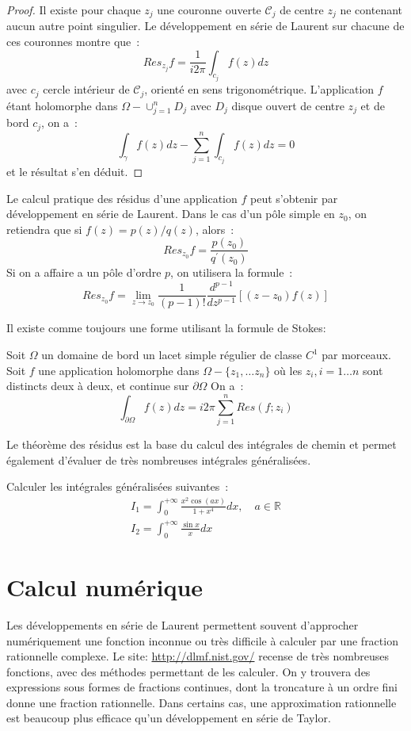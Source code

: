 \begin{proof}
Il existe pour chaque $z_j$ une
couronne ouverte $\mathcal{C}_j$ de centre $z_j$ ne contenant aucun autre point
singulier. Le développement en série de Laurent sur chacune de ces couronnes
montre que~:
\[
Res_{z_j}f = \frac{1}{i 2 \pi} \int_{c_j} f(z) dz
\]
avec $c_j$ cercle intérieur de $\mathcal{C}_j$, orienté en sens
trigonométrique. L'application $f$ étant holomorphe dans $\Omega - \cup_{j=1}^n
D_j$ avec $D_j$ disque ouvert de centre $z_j$ et de bord $c_j$, on a~:
\[
\int_{\gamma} f(z) dz - \sum_{j=1}^n \int_{c_j} f(z)dz =0
\]
et le résultat s'en déduit.
\end{proof}
\begin{rem}
Le calcul pratique des résidus d'une application $f$ peut s'obtenir par
développement en série de Laurent. Dans le cas d'un pôle simple en $z_0$, on
retiendra que si $f(z)=p(z)/q(z)$, alors~:
\[
Res_{z_0}f = \frac{p(z_0)}{q^\prime(z_0)}
\]
Si on a affaire a un pôle d'ordre $p$, on utilisera la formule~:
\[
Res_{z_0}f = \lim_{z \to z_0} \frac{1}{(p-1)!}
\frac{d^{p-1}}{dz^{p-1}}[(z-z_0)f(z)]
\]
\end{rem}
Il existe comme toujours une forme utilisant la formule de Stokes:

\begin{fthm}
Soit $\Omega$ un domaine de bord un lacet simple régulier de classe $C^1$
par morceaux. Soit $f$ une application
holomorphe dans $\Omega-\{z_1, \dots z_n\}$ où les $z_i,i=1\dots n$ sont
distincts deux à deux, et continue sur $\partial \Omega$ On a~:
\[
\int_{\partial \Omega} f(z) dz = i 2 \pi \sum_{j=1}^n Res(f;z_i)
\]
\end{fthm}

Le théorème des résidus est la base du calcul des intégrales de chemin et permet
également d'évaluer de très nombreuses intégrales généralisées.
\begin{exercice}
Calculer les intégrales généralisées suivantes~:
\[
\begin{array}{l}
I_1 = \int_0^{+\infty} \frac{x^2 \cos(ax)}{1+x^4} dx , \quad a \in
\mathbb{R}\\
I_2 = \int_0^{+\infty} \frac{ \sin x}{x}dx
\end{array}
\]
\end{exercice}
\section{Calcul numérique}
Les développements en série de Laurent permettent souvent d'approcher numériquement une fonction inconnue ou très difficile à calculer par une fraction rationnelle complexe. Le site:
\url{http://dlmf.nist.gov/} recense de très nombreuses fonctions, avec des méthodes permettant de les calculer. On y trouvera des expressions sous formes de fractions continues, dont la troncature à un ordre fini donne une fraction rationnelle. Dans certains cas, une approximation rationnelle est beaucoup plus efficace qu'un développement en série de Taylor. 

